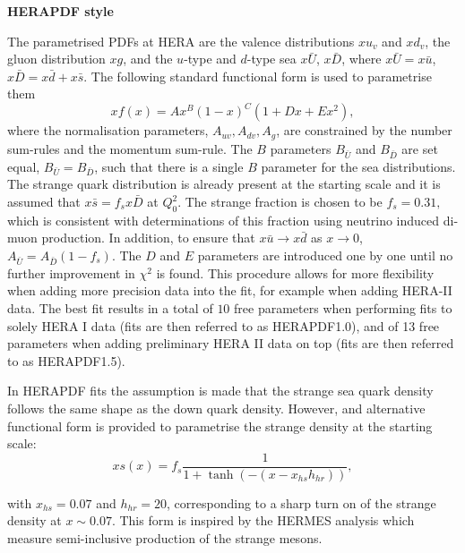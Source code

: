 \begin{description}

\item \bf{HERAPDF style}\rm

 The parametrised PDFs at HERA are the valence distributions
 $xu_v$ and  $xd_v$,  the gluon distribution $xg$, and the $u$-type and $d$-type sea 
$x\bar{U}$, $x\bar{D}$, where $x\bar{U} = x\bar{u}$, 
$x\bar{D} = x\bar{d} +x\bar{s}$. 
The following standard functional form is used to parametrise them
\begin{equation}
 xf(x) = A x^{B} (1-x)^{C} (1 + D x + E x^2),
\label{eqn:pdf}
\end{equation}
%
where the normalisation parameters, $A_{uv}, A_{dv}, A_g$,  
are constrained by the number sum-rules and the momentum sum-rule.
The $B$ parameters  $B_{\bar{U}}$ and $B_{\bar{D}}$ are set equal,
 $B_{\bar{U}}=B_{\bar{D}}$, such that 
there is a single $B$ parameter for the sea distributions. 
%
The strange quark distribution 
is already present at the starting scale and 
%
it is assumed that
$x\bar{s}= f_s  x\bar{D}$ at $Q^2_0$. 
The  strange fraction is chosen to be $f_s=0.31,$ which is
consistent with determinations 
of this fraction using neutrino induced di-muon production. 
%
In addition, to ensure that $x\bar{u} \to x\bar{d}$ 
as $x \to 0$,  
$A_{\bar{U}}=A_{\bar{D}} (1-f_s)$.
%
The $D$ and $E$ parameters are introduced one by one until no further improvement in $\chi^2$ is found.
This procedure allows for more flexibility when adding more precision data into the fit, for example when adding HERA-II data. 
The best fit  results in a total of $10$ free parameters when performing fits to solely HERA I data 
(fits are then referred to as HERAPDF1.0), and of 13 free parameters when adding preliminary HERA II data on top 
(fits are then referred to as HERAPDF1.5).

In HERAPDF fits the assumption is made that the strange sea quark density follows the same shape as the down quark density. 
However, and alternative functional form is provided to parametrise the strange density  at the starting scale:
\begin{equation}
xs(x)=f_s\frac{1}{1+\tanh(-(x-x_{hs}h_{hr}))},
\end{equation}

with $x_{hs} = 0.07$ and $h_{hr} = 20$, corresponding to a sharp turn on of the strange density at $x\sim 0.07$.
This form is inspired by the HERMES analysis \cite{hermes} which measure semi-inclusive production of the strange mesons.


\end{description}
